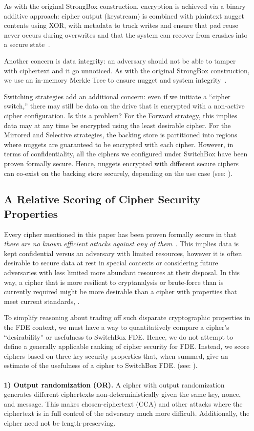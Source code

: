 As with the original StrongBox construction, encryption is achieved via a binary
additive approach: cipher output (keystream) is combined with plaintext nugget
contents using XOR, with metadata to track writes and ensure that pad reuse
never occurs during overwrites and that the system can recover from crashes into
a secure state~\cite{StrongBox}.

Another concern is data integrity: an adversary should not be able to tamper
with ciphertext and it go unnoticed. As with the original StrongBox
construction, we use an in-memory Merkle Tree to ensure nugget and system
integrity~\cite{StrongBox}.

Switching strategies add an additional concern: even if we initiate a ``cipher
switch,'' there may still be data on the drive that is encrypted with a
non-active cipher configuration. Is this a problem? For the Forward strategy,
this implies data may at any time be encrypted using the least desirable cipher.
For the Mirrored and Selective strategies, the backing store is partitioned into
regions where nuggets are guaranteed to be encrypted with each cipher. However,
in terms of confidentiality, all the ciphers we configured under SwitchBox have
been proven formally secure. Hence, nuggets encrypted with different secure
ciphers can co-exist on the backing store securely, depending on the use case
(see: ).

\subsection{A Relative Scoring of Cipher Security Properties}

Every cipher mentioned in this paper has been proven formally secure in that
\emph{there are no known efficient attacks against any of them}~\cite{All,
Ciphers, Again}. This implies data is kept confidential versus an adversary with
limited resources, however it is often desirable to secure data at rest in
special contexts or considering future adversaries with less limited more
abundant resources at their disposal. In this way, a cipher that is more
resilient to cryptanalysis or brute-force than is currently required might be
more desirable than a cipher with properties that meet current standards,
.

To simplify reasoning about trading off such disparate cryptographic properties
in the FDE context, we must have a way to quantitatively compare a cipher's
``desirability'' or usefulness to SwitchBox FDE. Hence, we do not attempt to
define a generally applicable ranking of cipher security for FDE. Instead, we
score ciphers based on three key security properties that, when summed, give an
estimate of the usefulness of a cipher to SwitchBox FDE. (see:
).\\
\\
\textbf{1) Output randomization (OR).} A cipher with output randomization
generates different ciphertexts non-deterministically given the same key, nonce,
and message. This makes chosen-ciphertext (CCA) and other attacks where the
ciphertext is in full control of the adversary much more difficult.
Additionally, the cipher need not be length-preserving.

